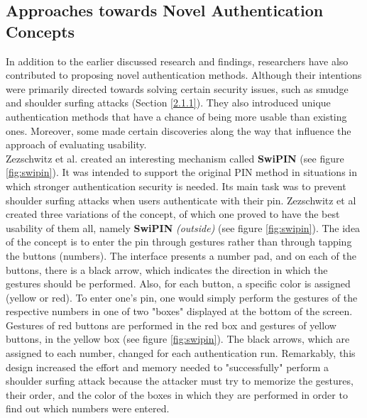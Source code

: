 \subsection{Approaches towards Novel Authentication Concepts} \label{2.2.3}
In addition to the earlier discussed research and findings, researchers have also contributed to proposing novel authentication methods. Although their intentions were primarily directed towards solving certain security issues, such as smudge and shoulder surfing attacks (Section \ref{2.1.1}). They also introduced unique authentication methods that have a chance of being more usable than existing ones. Moreover, some made certain discoveries along the way that influence the approach of evaluating usability.\\

Zezschwitz et al. \cite{Swipin} created an interesting mechanism called \textbf{SwiPIN} (see figure \ref{fig:swipin}). It was intended to support the original PIN method in situations in which stronger authentication security is needed. Its main task was to prevent shoulder surfing attacks when users authenticate with their pin. Zezschwitz et al \cite{Swipin} created three variations of the concept, of which one proved to have the best usability of them all, namely \textbf{SwiPIN} \textit{(outside)} (see figure \ref{fig:swipin}). The idea of the concept is to enter the pin through gestures rather than through tapping the buttons (numbers). The interface presents a number pad, and on each of the buttons, there is a black arrow, which indicates the direction in which the gestures should be performed. Also, for each button, a specific color is assigned (yellow or red). To enter one's pin, one would simply perform the gestures of the respective numbers in one of two "boxes" displayed at the bottom of the screen. Gestures of red buttons are performed in the red box and gestures of yellow buttons, in the yellow box (see figure \ref{fig:swipin}). The black arrows, which are assigned to each number, changed for each authentication run. Remarkably, this design increased the effort and memory needed to "successfully" perform a shoulder surfing attack because the attacker must try to memorize the gestures, their order, and the color of the boxes in which they are performed in order to find out which numbers were entered. \\

